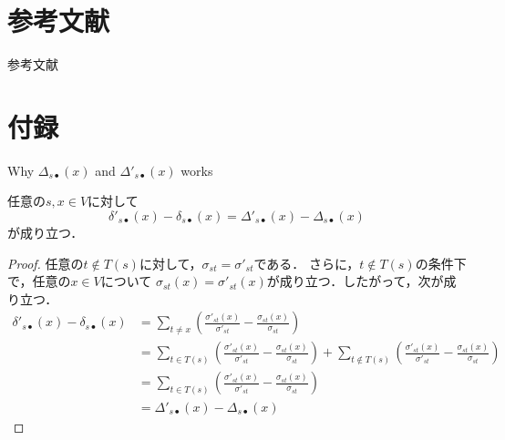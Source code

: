 \documentclass[dvipdfmx,fleqn]{beamer}
\begin{document}
\appendix
\section{参考文献}
\begin{frame}[allowframebreaks]{参考文献}
  \nocite{01Watts1998}
  \nocite{02Barabasi1999}
  \nocite{03Beauchamp1965}
  \nocite{04Bonacich1991}
  \nocite{05Freeman1977}
  \nocite{06Brandes2001}
  \nocite{07Puzis2012}
  \nocite{08Bentert2018}
  \nocite{09Erdos2015}
  \nocite{10Bader2006}
  \nocite{11Tan2009}
  \nocite{12Edmonds2010}
  \nocite{13Bernaschi2016}
  \nocite{14Brandes2007}
  \nocite{15Bader2007}
  \nocite{16Pfeffer2012}
  \nocite{17Yoshida2014}
  \nocite{18Holme2012}
  \nocite{19Lee2012}
  \nocite{20Singh2015}
  \nocite{21Hayashi2015}
  \nocite{22Bergamini2015a}
  \nocite{23Bergamini2015b}
  \nocite{24Ramalingam1996}
  \nocite{25Kas2013}
  \nocite{26Karger1993}
  \nocite{27Nasre2014a}
  \nocite{28Demetrescu2003}
  \nocite{29Nasre2014b}
  \nocite{30Pontecorvi2015}
  \nocite{31Bergamini2017}
  \nocite{32Leskovec2016}
  \nocite{33Rozemberczki2019b}
  \nocite{34OpenStreetMap}
  \printbibliography[title=]
\end{frame}

\section{付録}
\begin{frame}{Why $\Delta_{s\bullet}(x)$ and $\Delta'_{s\bullet}(x)$ works}
  \begin{theorem}
    任意の$s,x\in V$に対して
    \begin{equation*}
      \delta'_{s\bullet}(x)-\delta_{s\bullet}(x)=\Delta'_{s\bullet}(x)-\Delta_{s\bullet}(x)
    \end{equation*}
    が成り立つ．
  \end{theorem}
  \begin{proof}
    任意の$t\notin T(s)$に対して，$\sigma_{st}=\sigma'_{st}$である．
    さらに，$t\notin T(s)$の条件下で，任意の$x\in V$について
    $\sigma_{st}(x)=\sigma'_{st}(x)$が成り立つ．したがって，次が成り立つ．
    \begin{equation*}
      \begin{aligned}
        \delta'_{s\bullet}(x)-\delta_{s\bullet}(x)
        &=\sum_{t\neq x}\left(\frac{\sigma'_{st}(x)}{\sigma'_{st}}-\frac{\sigma_{st}(x)}{\sigma_{st}}\right) \\
        &=\sum_{t\in T(s)}\left(\frac{\sigma'_{st}(x)}{\sigma'_{st}}-\frac{\sigma_{st}(x)}{\sigma_{st}}\right)
        +\sum_{t\notin T(s)}\left(\frac{\sigma'_{st}(x)}{\sigma'_{st}}-\frac{\sigma_{st}(x)}{\sigma_{st}}\right) \\
        &=\sum_{t\in T(s)}\left(\frac{\sigma'_{st}(x)}{\sigma'_{st}}-\frac{\sigma_{st}(x)}{\sigma_{st}}\right) \\
        &=\Delta'_{s\bullet}(x)-\Delta_{s\bullet}(x)
      \end{aligned}
    \end{equation*}
  \end{proof}
\end{frame}
\end{document}
